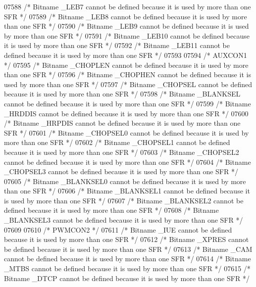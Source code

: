 \begin{DoxyCode}
07588 \textcolor{comment}{/* Bitname \_LEB7 cannot be defined because it is used by more than one SFR */}
07589 \textcolor{comment}{/* Bitname \_LEB8 cannot be defined because it is used by more than one SFR */}
07590 \textcolor{comment}{/* Bitname \_LEB9 cannot be defined because it is used by more than one SFR */}
07591 \textcolor{comment}{/* Bitname \_LEB10 cannot be defined because it is used by more than one SFR */}
07592 \textcolor{comment}{/* Bitname \_LEB11 cannot be defined because it is used by more than one SFR */}
07593 
07594 \textcolor{comment}{/* AUXCON1 */}
07595 \textcolor{comment}{/* Bitname \_CHOPLEN cannot be defined because it is used by more than one SFR */}
07596 \textcolor{comment}{/* Bitname \_CHOPHEN cannot be defined because it is used by more than one SFR */}
07597 \textcolor{comment}{/* Bitname \_CHOPSEL cannot be defined because it is used by more than one SFR */}
07598 \textcolor{comment}{/* Bitname \_BLANKSEL cannot be defined because it is used by more than one SFR */}
07599 \textcolor{comment}{/* Bitname \_HRDDIS cannot be defined because it is used by more than one SFR */}
07600 \textcolor{comment}{/* Bitname \_HRPDIS cannot be defined because it is used by more than one SFR */}
07601 \textcolor{comment}{/* Bitname \_CHOPSEL0 cannot be defined because it is used by more than one SFR */}
07602 \textcolor{comment}{/* Bitname \_CHOPSEL1 cannot be defined because it is used by more than one SFR */}
07603 \textcolor{comment}{/* Bitname \_CHOPSEL2 cannot be defined because it is used by more than one SFR */}
07604 \textcolor{comment}{/* Bitname \_CHOPSEL3 cannot be defined because it is used by more than one SFR */}
07605 \textcolor{comment}{/* Bitname \_BLANKSEL0 cannot be defined because it is used by more than one SFR */}
07606 \textcolor{comment}{/* Bitname \_BLANKSEL1 cannot be defined because it is used by more than one SFR */}
07607 \textcolor{comment}{/* Bitname \_BLANKSEL2 cannot be defined because it is used by more than one SFR */}
07608 \textcolor{comment}{/* Bitname \_BLANKSEL3 cannot be defined because it is used by more than one SFR */}
07609 
07610 \textcolor{comment}{/* PWMCON2 */}
07611 \textcolor{comment}{/* Bitname \_IUE cannot be defined because it is used by more than one SFR */}
07612 \textcolor{comment}{/* Bitname \_XPRES cannot be defined because it is used by more than one SFR */}
07613 \textcolor{comment}{/* Bitname \_CAM cannot be defined because it is used by more than one SFR */}
07614 \textcolor{comment}{/* Bitname \_MTBS cannot be defined because it is used by more than one SFR */}
07615 \textcolor{comment}{/* Bitname \_DTCP cannot be defined because it is used by more than one SFR */}

\end{DoxyCode}

